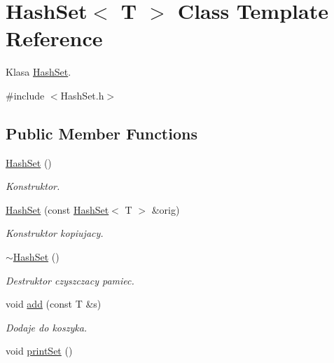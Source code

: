 \hypertarget{class_hash_set}{}\section{Hash\+Set$<$ T $>$ Class Template Reference}
\label{class_hash_set}


Klasa \hyperlink{class_hash_set}{Hash\+Set}.  




{\ttfamily \#include $<$Hash\+Set.\+h$>$}

\subsection*{Public Member Functions}
\begin{DoxyCompactItemize}
\item 
\hyperlink{class_hash_set_af3813c169024060da2044aafe3851a8d}{Hash\+Set} ()\hypertarget{class_hash_set_af3813c169024060da2044aafe3851a8d}{}\label{class_hash_set_af3813c169024060da2044aafe3851a8d}

\begin{DoxyCompactList}\small\item\em Konstruktor. \end{DoxyCompactList}\item 
\hyperlink{class_hash_set_a246e09f4a22069df2ec67ddf5a4d6958}{Hash\+Set} (const \hyperlink{class_hash_set}{Hash\+Set}$<$ T $>$ \&orig)\hypertarget{class_hash_set_a246e09f4a22069df2ec67ddf5a4d6958}{}\label{class_hash_set_a246e09f4a22069df2ec67ddf5a4d6958}

\begin{DoxyCompactList}\small\item\em Konstruktor kopiujacy. \end{DoxyCompactList}\item 
\hyperlink{class_hash_set_a58686b84c9bb5e744e279e5d52b8c656}{$\sim$\+Hash\+Set} ()\hypertarget{class_hash_set_a58686b84c9bb5e744e279e5d52b8c656}{}\label{class_hash_set_a58686b84c9bb5e744e279e5d52b8c656}

\begin{DoxyCompactList}\small\item\em Destruktor czyszczacy pamiec. \end{DoxyCompactList}\item 
void \hyperlink{class_hash_set_a01ec48fce289b5c3ed6194f2c7d951de}{add} (const T \&s)
\begin{DoxyCompactList}\small\item\em Dodaje do koszyka. \end{DoxyCompactList}\item 
void \hyperlink{class_hash_set_ad239cc6e812f4fa03c5f57b7c9e394f5}{print\+Set} ()\hypertarget{class_hash_set_ad239cc6e812f4fa03c5f57b7c9e394f5}{}\label{class_hash_set_ad239cc6e812f4fa03c5f57b7c9e394f5}


\end{DoxyCompactItemize}
